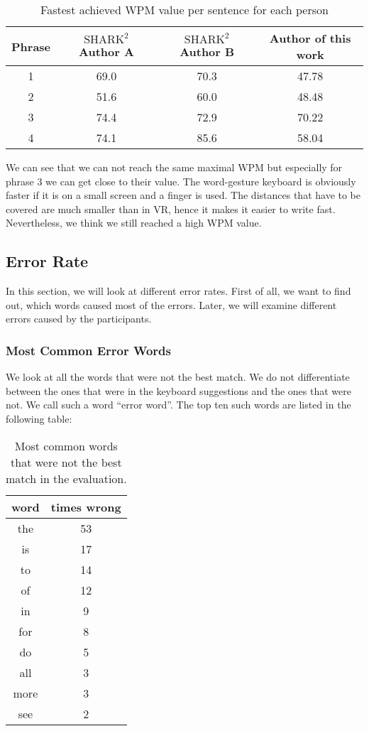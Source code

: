 \begin{table}[H]
    \centering
    \caption{Fastest achieved WPM value per sentence for each person}
    \begin{tabular}{cccc} \toprule
        Phrase&$\text{SHARK}^2$ Author A&$\text{SHARK}^2$ Author B&Author of this work\\ \midrule
        1&69.0&70.3&47.78\\
        2&51.6&60.0&48.48\\
        3&74.4&72.9&70.22\\
        4&74.1&85.6&58.04\\
        \bottomrule
    \end{tabular}
    \label{tab:top speed}
\end{table}
We can see that we can not reach the same maximal WPM but especially for phrase 3 we can get close to their value. The word-gesture keyboard is obviously faster if it is on a small screen and a finger is used. The distances that have to be covered are much smaller than in VR, hence it makes it easier to write fast. Nevertheless, we think we still reached a high WPM value.

\subsection{Error Rate}
In this section, we will look at different error rates. First of all, we want to find out, which words caused most of the errors. Later, we will examine different errors caused by the participants.

\subsubsection{Most Common Error Words}
We look at all the words that were not the best match. We do not differentiate between the ones that were in the keyboard suggestions and the ones that were not. We call such a word ``error word''. The top ten such words are listed in the following table:
\begin{table}[H]
    \centering
    \caption{Most common words that were not the best match in the evaluation.}
    \begin{tabular}{cc} \toprule
        word&times wrong\\ \midrule
        the & 53\\
        is & 17\\
        to & 14\\
        of & 12\\
        in & 9\\
        for & 8\\
        do & 5\\
        all & 3\\
        more & 3\\
        see & 2\\
        \bottomrule
    \end{tabular}
    \label{tab:error_words}
\end{table}

